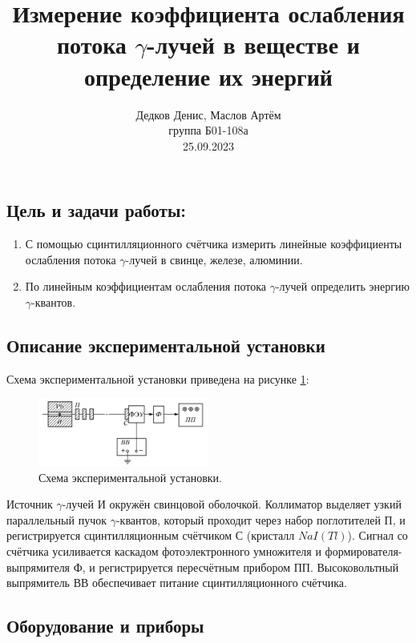 \documentclass[10pt,a4paper]{article}
\author{\normalsize Дедков Денис, Маслов Артём \\
	\normalsize группа Б01-108а \\
	\normalsize 25.09.2023}
\date{}
\title{
	\Large Измерение коэффициента ослабления потока $\gamma$-лучей в веществе и определение их энергий \\ 
}
\begin{document}
\maketitle
	
	\subsection*{Цель и задачи работы:}
	\begin{enumerate}
		\item С помощью сцинтилляционного счётчика измерить линейные коэффициенты ослабления потока $\gamma$-лучей в свинце, железе, алюминии.
		
		\item По линейным коэффициентам ослабления потока $\gamma$-лучей определить энергию $\gamma$-квантов.
	\end{enumerate}
	
	\subsection*{Описание экспериментальной установки}
	
	Схема экспериментальной установки приведена на рисунке \ref{img:exp_scheme}:
	\begin{figure}[H]
		\centering
		\includegraphics[width=0.5\textwidth]{images/exp_scheme.png}
		\caption{Схема экспериментальной установки.}
		\label{img:exp_scheme}
	\end{figure}

	Источник $\gamma$-лучей И окружён свинцовой оболочкой. Коллиматор выделяет узкий параллельный пучок $\gamma$-квантов, который проходит через набор поглотителей П, и регистрируется сцинтилляционным счётчиком С (кристалл $NaI(Tl)$). Сигнал со счётчика усиливается каскадом фотоэлектронного умножителя и формирователя-выпрямителя Ф, и регистрируется пересчётным прибором ПП. Высоковольтный выпрямитель ВВ обеспечивает питание сцинтилляционного счётчика.
	
	\subsection*{Оборудование и приборы}
	
\end{document}
